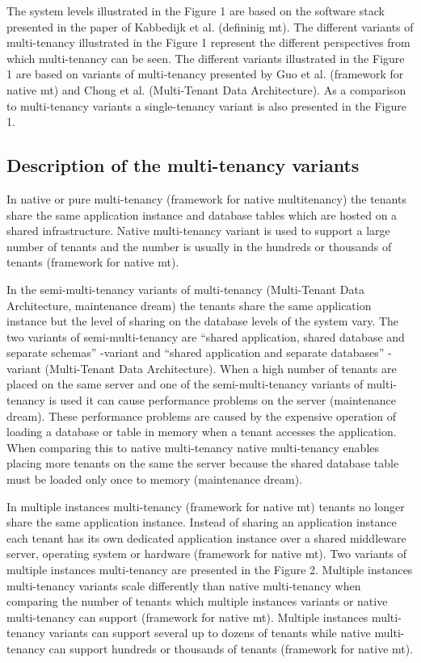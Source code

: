\documentclass[conference]{sasmoota2017}
\begin{document}
The system levels illustrated in the Figure 1 are based on the software stack presented in the paper of Kabbedijk et al. (defininig mt). The different variants of multi-tenancy illustrated in the Figure 1 represent the different perspectives from which multi-tenancy can be seen. The different variants illustrated in the Figure 1 are based on variants of multi-tenancy presented by Guo et al. (framework for native mt) and Chong et al. (Multi-Tenant Data Architecture). As a comparison to multi-tenancy variants a single-tenancy variant is also presented in the Figure 1. 


\subsection{Description of the multi-tenancy variants}

In native or pure multi-tenancy \cite{Kabbedijk2015:Defining} (framework for native multitenancy) the tenants share the same application instance and database tables which are hosted on a shared infrastructure. Native multi-tenancy variant is used to support a large number of tenants and the number is usually in the hundreds or thousands of tenants (framework for native mt). 

In the semi-multi-tenancy variants of multi-tenancy (Multi-Tenant Data Architecture, maintenance dream) the tenants share the same application instance but the level of sharing on the database levels of the system vary. The two variants of semi-multi-tenancy are “shared application, shared database and separate schemas” -variant and “shared application and separate databases” -variant (Multi-Tenant Data Architecture). When a high number of tenants are placed on the same server and one of the semi-multi-tenancy variants of multi-tenancy is used it can cause performance problems on the server (maintenance dream). These performance problems are caused by the expensive operation of loading a database or table in memory when a tenant accesses the application. When comparing this to native multi-tenancy native multi-tenancy enables placing more tenants on the same the server because the shared database table must be loaded only once to memory (maintenance dream).

In multiple instances multi-tenancy (framework for native mt) tenants no longer share the same application instance. Instead of sharing an application instance each tenant has its own dedicated application instance over a shared middleware server, operating system or hardware (framework for native mt). Two variants of multiple instances multi-tenancy are presented in the Figure 2. Multiple instances multi-tenancy variants scale differently than native multi-tenancy when comparing the number of tenants which multiple instances variants or native multi-tenancy can support (framework for native mt). Multiple instances multi-tenancy variants can support several up to dozens of tenants while native multi-tenancy can support hundreds or thousands of tenants (framework for native mt).
\end{document}
